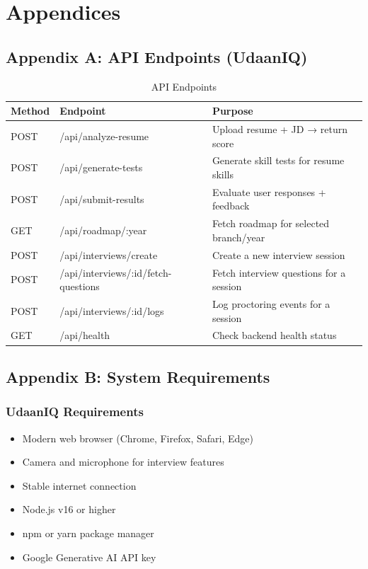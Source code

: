 \documentclass[12pt, conference]{IEEEtran}
\begin{document}
\section*{Appendices}

\subsection*{Appendix A: API Endpoints (UdaanIQ)}

\begin{table}[H]
\centering
\caption{API Endpoints}
\begin{tabular}{|l|l|l|}
\hline
\textbf{Method} & \textbf{Endpoint} & \textbf{Purpose} \\
\hline
POST & /api/analyze-resume & Upload resume + JD → return score \\
\hline
POST & /api/generate-tests & Generate skill tests for resume skills \\
\hline
POST & /api/submit-results & Evaluate user responses + feedback \\
\hline
GET & /api/roadmap/:year & Fetch roadmap for selected branch/year \\
\hline
POST & /api/interviews/create & Create a new interview session \\
\hline
POST & /api/interviews/:id/fetch-questions & Fetch interview questions for a session \\
\hline
POST & /api/interviews/:id/logs & Log proctoring events for a session \\
\hline
GET & /api/health & Check backend health status \\
\hline
\end{tabular}
\end{table}

\subsection*{Appendix B: System Requirements}

\subsubsection*{UdaanIQ Requirements}
\begin{itemize}
    \item Modern web browser (Chrome, Firefox, Safari, Edge)
    \item Camera and microphone for interview features
    \item Stable internet connection
    \item Node.js v16 or higher
    \item npm or yarn package manager
    \item Google Generative AI API key
\end{itemize}
\end{document}
